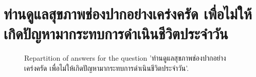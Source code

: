\documentclass[12pt]{article}
\begin{document}
\clearpage{}
\section{ท่านดูแลสุขภาพช่องปากอย่างเคร่งครัด เพื่อไม่ให้เกิดปัญหามากระทบการดำเนินชีวิตประจำวัน}

\label{sec:129}


\begin{figure}[h!]
    \caption{\label{figure:q129-1}Repartition of answers for the question 'ท่านดูแลสุขภาพช่องปากอย่างเคร่งครัด เพื่อไม่ให้เกิดปัญหามากระทบการดำเนินชีวิตประจำวัน'.}
\end{figure}
\end{document}
